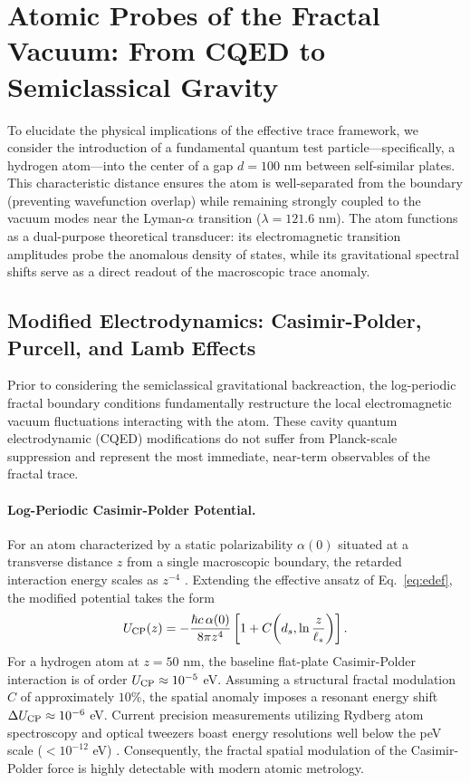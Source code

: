 \documentclass[12pt,letterpaper]{article}
\begin{document}
\section{Atomic Probes of the Fractal Vacuum: From CQED to Semiclassical Gravity}
\label{sec:atomic_probes}

To elucidate the physical implications of the effective trace framework, we consider the introduction of a fundamental quantum test particle---specifically, a hydrogen atom---into the center of a gap $d = 100$ nm between self-similar plates. This characteristic distance ensures the atom is well-separated from the boundary (preventing wavefunction overlap) while remaining strongly coupled to the vacuum modes near the Lyman-$\alpha$ transition ($\lambda = 121.6$ nm). The atom functions as a dual-purpose theoretical transducer: its electromagnetic transition amplitudes probe the anomalous density of states, while its gravitational spectral shifts serve as a direct readout of the macroscopic trace anomaly.

\subsection{Modified Electrodynamics: Casimir-Polder, Purcell, and Lamb Effects}

Prior to considering the semiclassical gravitational backreaction, the log-periodic fractal boundary conditions fundamentally restructure the local electromagnetic vacuum fluctuations interacting with the atom. These cavity quantum electrodynamic (CQED) modifications do not suffer from Planck-scale suppression and represent the most immediate, near-term observables of the fractal trace.

\paragraph{Log-Periodic Casimir-Polder Potential.} 
For an atom characterized by a static polarizability $\alpha(0)$ situated at a transverse distance $z$ from a single macroscopic boundary, the retarded interaction energy scales as $z^{-4}$ \cite{casimirpolder1948}. Extending the effective ansatz of Eq.~\eqref{eq:edef}, the modified potential takes the form
\begin{equation}
U_{\rm CP}(z) = -\frac{\hbar c \,\alpha(0)}{8\pi z^4} \left[ 1 + C\!\left(d_s, \ln\frac{z}{\ell_*}\right) \right].
\label{eq:CP_fractal}
\end{equation}
For a hydrogen atom at $z = 50$ nm, the baseline flat-plate Casimir-Polder interaction is of order $U_{\rm CP} \approx 10^{-5}$ eV. Assuming a structural fractal modulation $C$ of approximately $10\%$, the spatial anomaly imposes a resonant energy shift $\Delta U_{\rm CP} \approx 10^{-6}$ eV. Current precision measurements utilizing Rydberg atom spectroscopy and optical tweezers boast energy resolutions well below the peV scale ($< 10^{-12}$ eV) \cite{safronova2018}. Consequently, the fractal spatial modulation of the Casimir-Polder force is highly detectable with modern atomic metrology.
\end{document}
